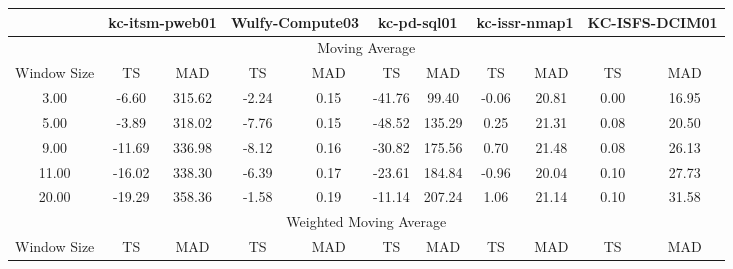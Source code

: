 \documentclass[conference,onecolumn]{IEEEtran}
\begin{document}
\begin{table}[ht]
\centering
\begin{tabular}{|c|c|c|c|c|c|c|c|c|c|c|}
\hline
            & \multicolumn{2}{c|}{kc-itsm-pweb01} & \multicolumn{2}{c|}{Wulfy-Compute03} & \multicolumn{2}{c|}{kc-pd-sql01} & \multicolumn{2}{c|}{kc-issr-nmap1} & \multicolumn{2}{c|}{KC-ISFS-DCIM01} \\ \hline
\multicolumn{11}{|c|}{Moving Average}                                                                                                                                                                  \\ \hline
Window Size & TS               & MAD              & TS                 & MAD             & TS              & MAD            & TS               & MAD             & TS               & MAD              \\ \hline
3.00        & -6.60            & 315.62           & -2.24              & 0.15            & -41.76          & 99.40          & -0.06            & 20.81           & 0.00             & 16.95            \\ \hline
5.00        & -3.89            & 318.02           & -7.76              & 0.15            & -48.52          & 135.29         & 0.25             & 21.31           & 0.08             & 20.50            \\ \hline
9.00        & -11.69           & 336.98           & -8.12              & 0.16            & -30.82          & 175.56         & 0.70             & 21.48           & 0.08             & 26.13            \\ \hline
11.00       & -16.02           & 338.30           & -6.39              & 0.17            & -23.61          & 184.84         & -0.96            & 20.04           & 0.10             & 27.73            \\ \hline
20.00       & -19.29           & 358.36           & -1.58              & 0.19            & -11.14          & 207.24         & 1.06             & 21.14           & 0.10             & 31.58            \\ \hline
\multicolumn{11}{|c|}{Weighted Moving Average}                                                                                                                                                         \\ \hline
Window Size & TS               & MAD              & TS                 & MAD             & TS              & MAD            & TS               & MAD             & TS               & MAD              \\ \hline

\end{tabular}
\end{table}
\end{document}
